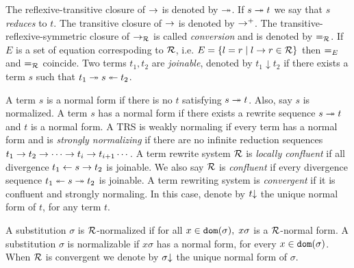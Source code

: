 The reflexive-transitive closure of $\rightarrow$ is denoted by $\twoheadrightarrow$. If $s \twoheadrightarrow t$ we say that $s$ \textit{reduces} to $t$. The transitive closure of $\rightarrow$ is denoted by $\rightarrow^+$. The transitive-reflexive-symmetric closure of $\rightarrow_{\mathcal{R}}$ is called \textit{conversion} and is denoted by $\eqUnif{\trs}$. If $E$ is a set of equation correspoding to $\mathcal{R}$, i.e. $E = \{ l = r \mid l \rightarrow r \in \mathcal{R} \}$ then $\eqUnif{E}$ and $\eqUnif{\trs}$ coincide. Two terms $t_1, t_2$ are \textit{joinable}, denoted by $t_1 \downarrow t_2$ if there exists a term $s$ such that $t_1 \twoheadrightarrow s \twoheadleftarrow t_2$.

A term $s$ is a normal form if there is no $t$ satisfying $s \twoheadrightarrow t$. Also, say $s$ is normalized. A term $s$ has a normal form if there exists a rewrite sequence $s \twoheadrightarrow t$ and $t$ is a normal form. A TRS is weakly normaling if every term has a normal form and is \textit{strongly normalizing} if there are no infinite reduction sequences $t_1 \rightarrow t_2 \rightarrow \cdots \rightarrow t_i \rightarrow t_{i+1} \cdots$. A term rewrite system $\mathcal{R}$ is \textit{locally confluent} if all divergence $t_1 \leftarrow s \rightarrow t_2$ is joinable. We also say $\mathcal{R}$ is \textit{confluent} if every divergence sequence $t_1 \twoheadleftarrow s \twoheadrightarrow t_2$ is joinable. A term rewriting system is \textit{convergent} if it is confluent and strongly normaling. In this case, denote by $t\mathord{\downarrow}$ the unique normal form of $t$, for any term $t$.

A substitution $\sigma$ is $\mathcal{R}$-normalized if for all $x \in \mathtt{dom}(\sigma), \; x \sigma$ is a $\mathcal{R}$-normal form. A substitution $\sigma$ is normalizable if $x \sigma$ has a normal form, for every $x \in \mathtt{dom}(\sigma)$. When $\mathcal{R}$ is convergent we denote by $\sigma\mathord{\downarrow}$ the unique normal form of $\sigma$.
